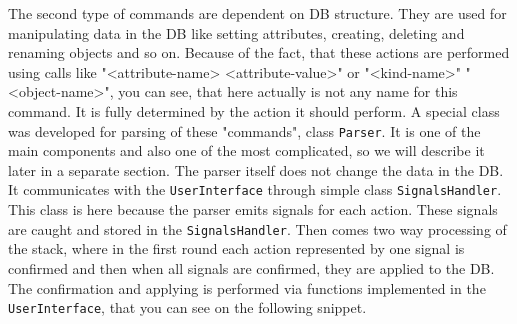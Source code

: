 \documentclass[deska]{subfiles}
\begin{document}
The second type of commands are dependent on DB structure. They are used for manipulating data in the DB like setting attributes,
creating, deleting and renaming objects and so on. Because of the fact, that these actions are performed using calls
like "<attribute-name> <attribute-value>" or "<kind-name>" "<object-name>", you can see, that here actually is not any
name for this command. It is fully determined by the action it should perform. A special class was developed for parsing
of these "commands", class {\tt Parser}. It is one of the main components and also one of the most complicated, so we will
describe it later in a separate section. The parser itself does not change the data in the DB. It communicates with the
{\tt UserInterface} through simple class {\tt SignalsHandler}. This class is here because the parser emits signals for
each action. These signals are caught and stored in the {\tt SignalsHandler}. Then comes two way processing of the stack,
where in the first round each action represented by one signal is confirmed and then when all signals are confirmed, they
are applied to the DB. The confirmation and applying is performed via functions implemented in the {\tt UserInterface},
that you can see on the following snippet.
\end{document}
